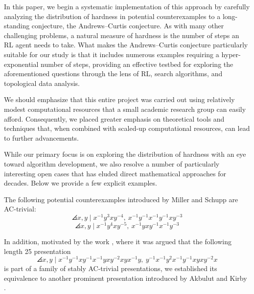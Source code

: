 In this paper, we begin a systematic implementation of this approach by carefully analyzing the distribution of hardness in potential counterexamples to a long-standing conjecture, the Andrews--Curtis conjecture. As with many other challenging problems, a natural measure of hardness is the number of steps an RL agent needs to take. What makes the Andrews--Curtis conjecture particularly suitable for our study is that it includes numerous examples requiring a hyper-exponential number of steps, providing an effective testbed for exploring the aforementioned questions through the lens of RL, search algorithms, and topological data analysis.

We should emphasize that this entire project was carried out using relatively modest computational resources that a small academic research group can easily afford. Consequently, we placed greater emphasis on theoretical tools and techniques that, when combined with scaled-up computational resources, can lead to further advancements.

While our primary focus is on exploring the distribution of hardness with an eye toward algorithm development, we also resolve a number of particularly interesting open cases that has eluded direct mathematical approaches for decades. Below we provide a few explicit examples.

\begin{theorem}\label{thm:MS}
	The following potential counterexamples introduced by Miller and Schupp \cite{Miller--Schupp} are AC-trivial:
	\begin{equation}
		\angles{x, y \mid x^{-1} y^3 x y^{-4} , \ x^{-1} y^{-1} x^{-1} y^{-1} x y^{-3} }
	\end{equation}
	\begin{equation}
		\angles{x, y \mid x^{-1} y^4 x y^{-5} , \ x^{-1} y x y^{-1} x^{-1} y^{-3} }
	\end{equation}
\end{theorem}

\medskip\noindent
In addition, motivated by the work \cite{MMS}, where it was argued that the following length 25 presentation
\begin{equation}\label{eq:MMS3}
	\angles{ x, y \mid
		x^{-1}y^{-1}xy^{-1}x^{-1}yxy^{-2}xyx^{-1}y, \
		y^{-1}x^{-1}y^2x^{-1}y^{-1}xyxy^{-2}x }
\end{equation}
is part of a family of stably AC-trivial presentations, we established its equivalence to another prominent presentation introduced by Akbulut and Kirby \cite{Akbulut--Kirby}.

